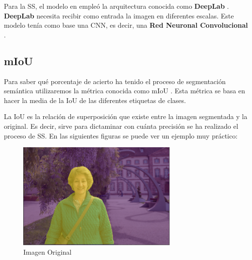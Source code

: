 Para la \ac{SS}, el modelo en \cite{isa2} empleó la arquitectura conocida como \textbf{DeepLab} \cite{deeplab}. \textbf{DeepLab} necesita recibir como entrada la imagen en diferentes escalas. Este modelo tenía como base una \ac{CNN}, es decir, una \textbf{Red Neuronal Convolucional} \cite{cnn}. %
 







\subsection{mIoU}

Para saber qué porcentaje de acierto ha tenido el proceso de segmentación semántica utilizaremos la métrica conocida como \ac{mIoU} \cite{miou-iou}. Esta métrica se basa en hacer la media de la \ac{IoU} de las diferentes etiquetas de clases.

La \ac{IoU} \cite{miou-iou} es la relación de superposición que existe entre la imagen segmentada y la original. Es decir, sirve para dictaminar con cuánta precisión se ha realizado el proceso de \ac{SS}. En las siguientes figuras se puede ver un ejemplo muy práctico:

\begin{figure}[H]
  \centering
  \includegraphics[width=8cm]{Figuras/Iou_1.eps}
  \caption{Imagen Original}
\end{figure}


